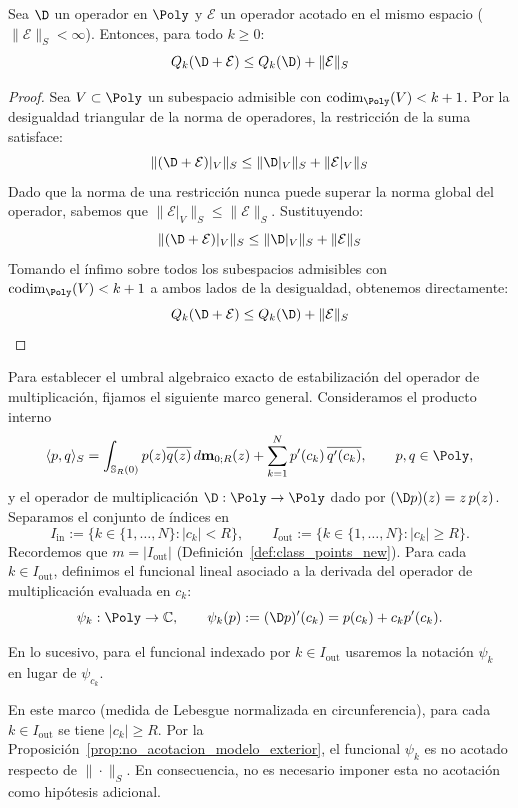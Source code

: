 \begin{prop}\label{prop:Qk_perturbacion}
	Sea $\D$ un operador en $\Poly$ y $\mathcal{E}$ un operador acotado en el mismo espacio ($\|\mathcal{E}\|_S < \infty$). Entonces, para todo $k \ge 0$:
	$$ Q_k(\D + \mathcal{E}) \le Q_k(\D) + \|\mathcal{E}\|_S $$
\end{prop}

\begin{proof}
	Sea $V \subset \Poly$ un subespacio admisible con $\operatorname{codim}_{\Poly}(V) < k+1$. Por la desigualdad triangular de la norma de operadores, la restricción de la suma satisface:
	$$ \|(\D + \mathcal{E})|_V\|_S \le \|\D|_V\|_S + \|\mathcal{E}|_V\|_S $$
	Dado que la norma de una restricción nunca puede superar la norma global del operador, sabemos que $\|\mathcal{E}|_V\|_S \le \|\mathcal{E}\|_S$. Sustituyendo:
	$$ \|(\D + \mathcal{E})|_V\|_S \le \|\D|_V\|_S + \|\mathcal{E}\|_S $$
	Tomando el ínfimo sobre todos los subespacios admisibles con $\operatorname{codim}_{\Poly}(V)<k+1$ a ambos lados de la desigualdad, obtenemos directamente:
	$$ Q_k(\D + \mathcal{E}) \le Q_k(\D) + \|\mathcal{E}\|_S $$
\end{proof}

Para establecer el umbral algebraico exacto de estabilización del operador de multiplicación, fijamos el siguiente marco general. Consideramos el producto interno
\[
	\langle p,q\rangle_S
	=
	\int_{\mathbb{S}_R(0)} p(z)\overline{q(z)} \, d\mathbf{m}_{0;R}(z)
	+
	\sum_{k=1}^N p'(c_k)\,\overline{q'(c_k)},
	\qquad p,q\in\Poly,
\]
y el operador de multiplicación $\D:\Poly\to\Poly$ dado por $(\D p)(z)=z\,p(z)$. Separamos el conjunto de índices en
\[
	I_{\mathrm{in}}:=\{k\in\{1,\dots,N\}: |c_k|<R\},
	\qquad
	I_{\mathrm{out}}:=\{k\in\{1,\dots,N\}: |c_k|\ge R\}.
\]
Recordemos que $m=|I_{\mathrm{out}}|$ (Definición~\ref{def:class_points_new}).
Para cada $k\in I_{\mathrm{out}}$, definimos el funcional lineal asociado a la derivada del operador de multiplicación evaluada en $c_k$:
\[
	\psi_k:\Poly\to\mathbb C,
	\qquad
	\psi_k(p):=(\D p)'(c_k)=p(c_k)+c_kp'(c_k).
\]

\begin{rmk}
	En lo sucesivo, para el funcional indexado por $k \in I_{\mathrm{out}}$ usaremos la notación $\psi_k$ en lugar de $\psi_{c_k}$.
\end{rmk}

\begin{rmk}
	En este marco (medida de Lebesgue normalizada en circunferencia), para cada $k\in I_{\mathrm{out}}$ se tiene $|c_k|\ge R$. Por la Proposición~\ref{prop:no_acotacion_modelo_exterior}, el funcional $\psi_k$ es no acotado respecto de $\|\cdot\|_S$. En consecuencia, no es necesario imponer esta no acotación como hipótesis adicional.
\end{rmk}

